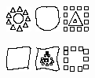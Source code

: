 \begin{figure}[p]
\centering
\includegraphics[width=.3\linewidth]{ext/ex/1.png}
\quad
\includegraphics[width=.3\linewidth]{ext/ex/2.png}
\quad
\includegraphics[width=.3\linewidth]{ext/ex/3.png}

\vspace{1cm}

\centering
\includegraphics[width=.3\linewidth]{ext/ex/4.png}
\quad
\includegraphics[width=.3\linewidth]{ext/ex/5.png}
\quad
\includegraphics[width=.3\linewidth]{ext/ex/6.png}


\end{figure}
